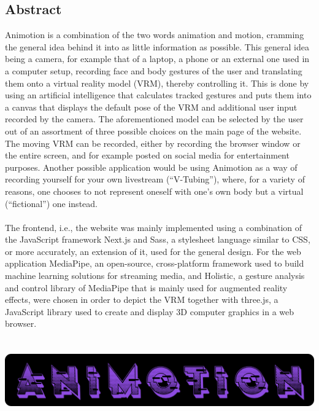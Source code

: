 \begin{spacing}{1}
    \chapter*{Abstract}
\end{spacing}
Animotion is a combination of the two words animation and motion, cramming the general idea behind it into as little information as possible. This general idea being a camera, for example that of a laptop, a phone or an external one used in a computer setup, recording face and body gestures of the user and translating them onto a virtual reality model (VRM), thereby controlling it. This is done by using an artificial intelligence that calculates tracked gestures and puts them into a canvas that displays the default pose of the VRM and additional user input recorded by the camera. The aforementioned model can be selected by the user out of an assortment of three possible choices on the main page of the website. The moving VRM can be recorded, either by recording the browser window or the entire screen, and for example posted on social media for entertainment purposes. Another possible application would be using Animotion as a way of recording yourself for your own livestream (“V-Tubing”), where, for a variety of reasons, one chooses to not represent oneself with one’s own body but a virtual (“fictional”) one instead.
\\
\\
The frontend, i.e., the website was mainly implemented using a combination of the JavaScript framework Next.js and Sass, a stylesheet language similar to CSS, or more accurately, an extension of it, used for the general design. For the web application MediaPipe, an open-source, cross-platform framework used to build machine learning solutions for streaming media, and Holistic, a gesture analysis and control library of MediaPipe that is mainly used for augmented reality effects, were chosen in order to depict the VRM together with three.js, a JavaScript library used to create and display 3D computer graphics in a web browser.
\\
\\
\\
\includegraphics[width=1\textwidth]{pics/animotionlogo.png}

